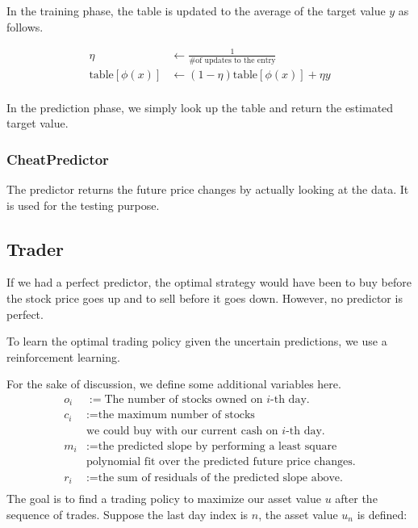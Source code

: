 \documentclass[twocolumn,10pt]{asme2ej}
\begin{document}
In the training phase, the table is updated to the average of the
target value $y$ as follows.

\begin{align*}
  \eta &\gets \frac{1}{\text{\# of updates to the entry}} \\
  \text{table}[\phi(x)] &\gets (1 - \eta)\text{table}[\phi(x)] + \eta y \\
\end{align*}

In the prediction phase, we simply look up the table and return the
estimated target value.

\subsubsection{CheatPredictor}

The predictor returns the future price changes by actually looking at the
data. It is used for the testing purpose.

\subsection{Trader}

If we had a perfect predictor, the optimal strategy would have been to
buy before the stock price goes up and to sell before it goes
down. However, no predictor is perfect.

To learn the optimal trading policy given the uncertain predictions,
we use a reinforcement learning.

For the sake of discussion, we define some additional variables here.
\begin{align*}
  o_i &:= \text{The number of stocks owned on }i\text{-th day.} \\
  c_i &:= \text{the maximum number of stocks}\\
  & \text{we could buy with our current cash on }i\text{-th day.} \\
  m_i &:= \text{the predicted slope by performing a least square} \\
  & \text{polynomial fit over the predicted future price changes.} \\
  r_i &:= \text{the sum of residuals of the predicted slope above.} \\
\end{align*}
The goal is to find a trading policy to maximize our asset value $u$
after the sequence of trades. Suppose the last day index is $n$, the
asset value $u_n$ is defined:
\end{document}
